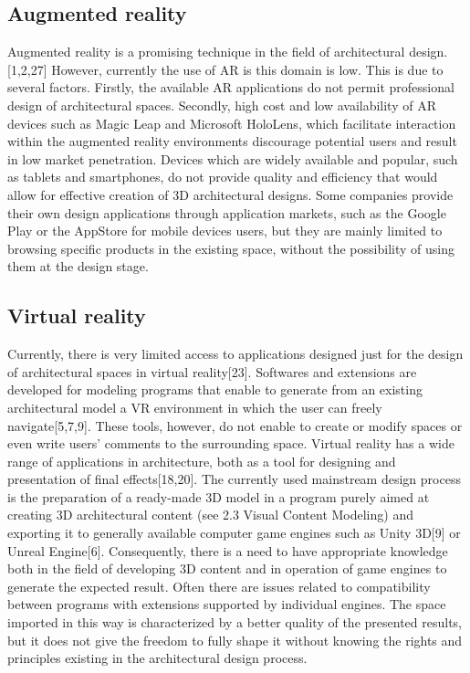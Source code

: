 \documentclass[runningheads]{llncs}
\begin{document}
\subsection{Augmented reality}
Augmented reality is a promising technique in the field of architectural design.[1,2,27] However, currently the use of AR is this domain is low. This is due to several factors. Firstly, the available AR applications do not permit professional design of architectural spaces. Secondly, high cost and low availability of AR devices such as Magic Leap and Microsoft HoloLens, which facilitate interaction within the augmented reality environments discourage potential users and result in low market penetration. Devices which are widely available and popular, such as tablets and smartphones, do not provide quality and efficiency that would allow for effective creation of 3D architectural designs. Some companies provide their own design applications through application markets, such as the Google Play or the AppStore for mobile devices users, but they are mainly limited to browsing specific products in the existing space, without the possibility of using them at the design stage.

\subsection{Virtual reality}
Currently, there is very limited access to applications designed just for the design of architectural spaces in virtual reality[23]. Softwares and extensions are developed for modeling programs that enable to generate from an existing architectural model a VR environment in which the user can freely navigate[5,7,9]. These tools, however, do not enable to create or modify spaces or even write users' comments to the surrounding space. Virtual reality has a wide range of applications in architecture, both as a tool for designing and presentation of final effects[18,20]. The currently used mainstream design process is the preparation of a ready-made 3D model in a program purely aimed at creating 3D architectural content (see 2.3 Visual Content Modeling) and exporting it to generally available computer game engines such as Unity 3D[9] or Unreal Engine[6]. Consequently, there is a need to have appropriate knowledge both in the field of developing 3D content and in operation of game engines to generate the expected result. Often there are issues related to compatibility between programs with extensions supported by individual engines. The space imported in this way is characterized by a better quality of the presented results, but it does not give the freedom to fully shape it without knowing the rights and principles existing in the architectural design process.
\end{document}
